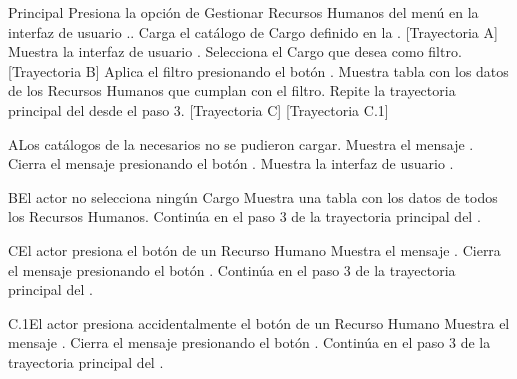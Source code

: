 \begin{UCtrayectoria}{Principal}
    \UCpaso[\UCactor] Presiona la opción de Gestionar Recursos Humanos del menú en la interfaz de usuario ..
    \UCpaso Carga el catálogo de Cargo definido en la . [Trayectoria A]
    \UCpaso Muestra la interfaz de usuario .
    \UCpaso[\UCactor] Selecciona el Cargo que desea como filtro. [Trayectoria B]
    \UCpaso[\UCactor] Aplica el filtro presionando el botón .
    \UCpaso Muestra tabla con los datos de los Recursos Humanos que cumplan con el filtro.
    \UCpaso Repite la trayectoria principal del  desde el paso 3. [Trayectoria C] [Trayectoria C.1]
\end{UCtrayectoria}
\begin{UCtrayectoriaA}{A}{Los catálogos de la  necesarios no se pudieron cargar.}
    \UCpaso Muestra el mensaje .
    \UCpaso[\UCactor] Cierra el mensaje presionando el botón .
    \UCpaso Muestra la interfaz de usuario .
\end{UCtrayectoriaA}
\begin{UCtrayectoriaA}{B}{El actor no selecciona ningún Cargo}
    \UCpaso Muestra una tabla con los datos de todos los Recursos Humanos.
    \UCpaso Continúa en el paso 3 de la trayectoria principal del .
\end{UCtrayectoriaA}
\begin{UCtrayectoriaA}{C}{El actor presiona el botón  de un Recurso Humano}
    \UCpaso Muestra el mensaje .
    \UCpaso[\UCactor] Cierra el mensaje presionando el botón .
    \UCpaso Continúa en el paso 3 de la trayectoria principal del .
\end{UCtrayectoriaA}
\begin{UCtrayectoriaA}{C.1}{El actor presiona accidentalmente el botón  de un Recurso Humano}
    \UCpaso Muestra el mensaje .
    \UCpaso[\UCactor] Cierra el mensaje presionando el botón .
    \UCpaso Continúa en el paso 3 de la trayectoria principal del .
\end{UCtrayectoriaA}